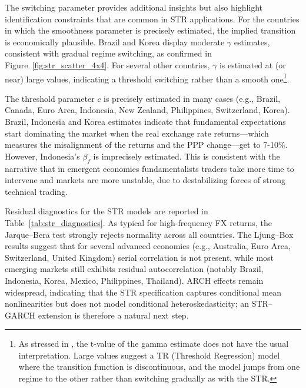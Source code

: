 \documentclass[a4paper,10pt,final]{article}    %
\begin{document}
The switching parameter provides additional insights but also highlight identification constraints that are common in STR applications. For the countries in which the smoothness parameter is precisely estimated, the implied transition is economically plausible. Brazil and Korea display moderate $\gamma$ estimates, consistent with gradual regime switching, as confirmed in Figure~\ref{fig:str_scatter_4x4}. For several other countries, $\gamma$ is estimated at (or near) large values, indicating a threshold switching rather than a smooth one\footnote{As stressed in \citet{GrangerTerasvirta2010}, the t-value of the gamma estimate does not have the usual interpretation. Large values suggest a TR (Threshold Regression) model where the transition function is discontinuous, and the model jumps from one regime to the other rather than switching gradually as with the STR.}.

The threshold parameter $c$ is precisely estimated in many cases (e.g., Brazil, Canada, Euro Area, Indonesia, New Zealand, Philippines, Switzerland, Korea). Brazil, Indonesia and Korea estimates indicate that fundamental expectations start dominating the market when the real exchange rate returns---which measures the misalignment of the returns and the PPP change---get to 7-10\%. However, Indonesia's $\beta_f$ is imprecisely estimated. This is consistent with the narrative that in emergent economies fundamentalists traders take more time to intervene and markets are more unstable, due to destabilizing forces of strong technical trading.

Residual diagnostics for the STR models are reported in Table~\ref{tab:str_diagnostics}. As typical for high-frequency FX returns, the Jarque--Bera test strongly rejects normality across all countries. The Ljung--Box results suggest that for several advanced economies (e.g., Australia, Euro Area, Switzerland, United Kingdom) serial correlation is not present, while most emerging markets still exhibits residual autocorrelation (notably Brazil, Indonesia, Korea, Mexico, Philippines, Thailand). ARCH effects remain widespread, indicating that the STR specification captures conditional mean nonlinearities but does not model conditional heteroskedasticity; an STR--GARCH extension is therefore a natural next step.
\end{document}
